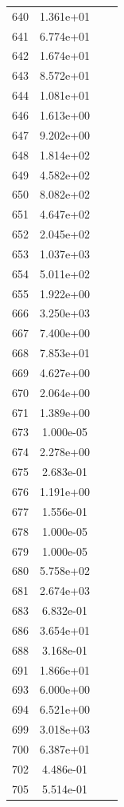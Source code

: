 \documentclass[12pt]{article}
\begin{document}
\begin{longtable}{@{}cccc@{}}
640 & 1.361e+01 &  &  \\
641 & 6.774e+01 &  &  \\
642 & 1.674e+01 &  &  \\
643 & 8.572e+01 &  &  \\
644 & 1.081e+01 &  &  \\
646 & 1.613e+00 &  &  \\
647 & 9.202e+00 &  &  \\
648 & 1.814e+02 &  &  \\
649 & 4.582e+02 &  &  \\
650 & 8.082e+02 &  &  \\
651 & 4.647e+02 &  &  \\
652 & 2.045e+02 &  &  \\
653 & 1.037e+03 &  &  \\
654 & 5.011e+02 &  &  \\
655 & 1.922e+00 &  &  \\
666 & 3.250e+03 &  &  \\
667 & 7.400e+00 &  &  \\
668 & 7.853e+01 &  &  \\
669 & 4.627e+00 &  &  \\
670 & 2.064e+00 &  &  \\
671 & 1.389e+00 &  &  \\
673 & 1.000e-05 &  &  \\
674 & 2.278e+00 &  &  \\
675 & 2.683e-01 &  &  \\
676 & 1.191e+00 &  &  \\
677 & 1.556e-01 &  &  \\
678 & 1.000e-05 &  &  \\
679 & 1.000e-05 &  &  \\
680 & 5.758e+02 &  &  \\
681 & 2.674e+03 &  &  \\
683 & 6.832e-01 &  &  \\
686 & 3.654e+01 &  &  \\
688 & 3.168e-01 &  &  \\
691 & 1.866e+01 &  &  \\
693 & 6.000e+00 &  &  \\
694 & 6.521e+00 &  &  \\
699 & 3.018e+03 &  &  \\
700 & 6.387e+01 &  &  \\
702 & 4.486e-01 &  &  \\
705 & 5.514e-01 &  &  \\

\end{longtable}
\end{document}
